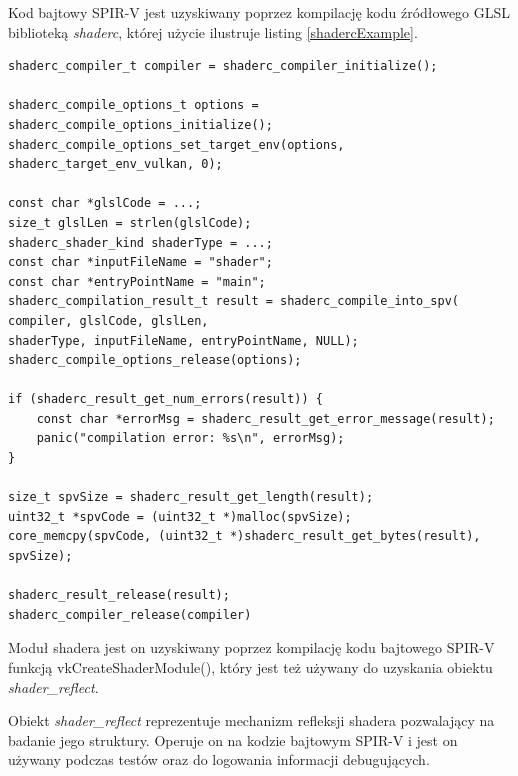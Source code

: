 Kod bajtowy SPIR-V jest uzyskiwany poprzez kompilację kodu źródłowego GLSL biblioteką \textit{shaderc}, której użycie ilustruje listing \ref{shadercExample}.
\lstset{language=C}
\begin{lstlisting}[caption={Kompilacja kodu źródłowego GLSL biblioteką \textit{shaderc}},captionpos=b,label={shadercExample}]
shaderc_compiler_t compiler = shaderc_compiler_initialize();

shaderc_compile_options_t options = shaderc_compile_options_initialize();
shaderc_compile_options_set_target_env(options, shaderc_target_env_vulkan, 0);

const char *glslCode = ...;
size_t glslLen = strlen(glslCode);
shaderc_shader_kind shaderType = ...;
const char *inputFileName = "shader";
const char *entryPointName = "main";
shaderc_compilation_result_t result = shaderc_compile_into_spv(
compiler, glslCode, glslLen,
shaderType, inputFileName, entryPointName, NULL);
shaderc_compile_options_release(options);

if (shaderc_result_get_num_errors(result)) {
	const char *errorMsg = shaderc_result_get_error_message(result);
	panic("compilation error: %s\n", errorMsg);
}

size_t spvSize = shaderc_result_get_length(result);
uint32_t *spvCode = (uint32_t *)malloc(spvSize);
core_memcpy(spvCode, (uint32_t *)shaderc_result_get_bytes(result), spvSize);

shaderc_result_release(result);
shaderc_compiler_release(compiler)
\end{lstlisting}

Moduł shadera jest on uzyskiwany poprzez kompilację kodu bajtowego SPIR-V funkcją vkCreateShaderModule(), który jest też używany do uzyskania obiektu \textit{shader\_reflect}.

Obiekt \textit{shader\_reflect} reprezentuje mechanizm refleksji shadera pozwalający na badanie jego struktury.
Operuje on na kodzie bajtowym SPIR-V i jest on używany podczas testów oraz do logowania informacji debugujących.



